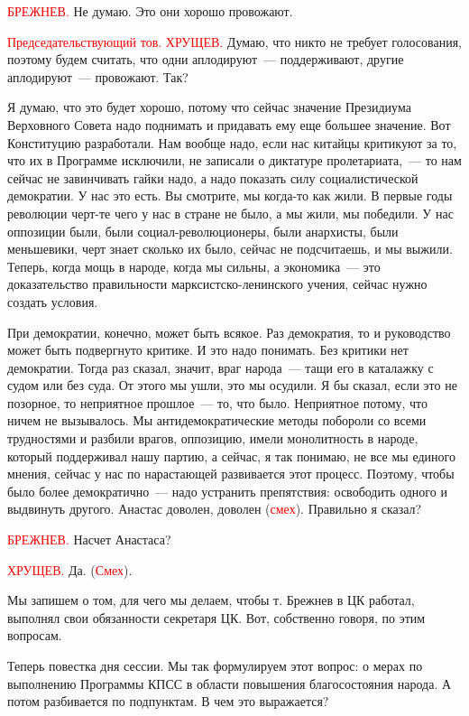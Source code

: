 \documentclass{kursa4}
\begin{document}
{      \textcolor{red}{БРЕЖНЕВ.}{
      Не думаю. Это они хорошо провожают.}

      \textcolor{red}{Председательствующий тов. ХРУЩЕВ.}{ Думаю, что никто не требует голосования, поэтому будем считать, что одни аплодируют~--- поддерживают, другие аплодируют~--- провожают. Так?}

      {Я думаю, что это будет хорошо, потому что сейчас значение Президиума Верховного Совета надо поднимать и придавать ему еще большее значение. Вот Конституцию разработали. Нам вообще надо, если нас китайцы критикуют за то, что их в Программе исключили, не записали о диктатуре пролетариата,~--- то нам сейчас не завинчивать гайки надо, а надо показать силу социалистической демократии. У нас это есть. Вы смотрите, мы когда-то как жили. В первые годы революции черт-те чего у нас в стране не было, а мы жили, мы победили. У нас оппозиции были, были социал-революционеры, были анархисты, были меньшевики, черт знает сколько их было, сейчас не подсчитаешь, и мы выжили. Теперь, когда мощь в народе, }{когда мы сильны, а экономика~--- это доказательство правильности марксистско-ленинского учения, сейчас нужно создать условия.}

      {При демократии, конечно, может быть всякое. Раз демократия, то и руководство может быть подвергнуто критике. И это надо понимать. Без критики нет демократии. Тогда раз сказал, значит, враг народа~--- тащи его в каталажку с судом или без суда. От этого мы ушли, это мы осудили. Я бы сказал, если это не позорное, то неприятное прошлое~--- то, что было. Неприятное потому, что ничем не вызывалось. Мы антидемократические методы побороли со всеми трудностями и разбили врагов, оппозицию, имели монолитность в народе, который поддерживал нашу партию, а сейчас, я так понимаю, не все мы единого мнения, сейчас у нас по нарастающей развивается этот процесс. Поэтому, чтобы было более демократично~--- надо устранить препятствия: освободить одного и выдвинуть другого. Анастас доволен, доволен (}\textcolor{red}{смех}{). Правильно я сказал?}

      \textcolor{red}{БРЕЖНЕВ.}{
      Насчет Анастаса?}

      \textcolor{red}{ХРУЩЕВ.}{
      Да. (}\textcolor{red}{Смех}{).}

      {Мы запишем о том, для чего мы делаем, чтобы т. Брежнев в ЦК работал, выполнял свои обязанности секретаря ЦК. Вот, собственно говоря, по этим вопросам.}

      {Теперь повестка дня сессии. Мы так формулируем этот вопрос: о мерах по выполнению Программы КПСС в области повышения благосостояния народа. А потом разбивается по подпунктам. В чем это выражается?}

}
\end{document}
